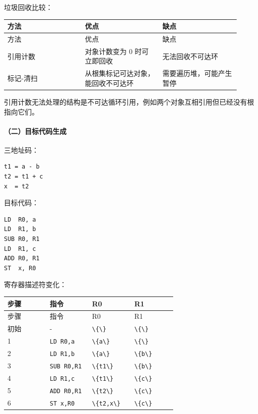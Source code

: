 \documentclass[UTF8]{ctexart}
\begin{document}
垃圾回收比较：

\begin{longtable}{|p{0.31\linewidth}|p{0.31\linewidth}|p{0.31\linewidth}|}
\hline
方法 & 优点 & 缺点 \\
\hline
\endfirsthead
方法 & 优点 & 缺点 \\
\hline
\endhead
引用计数 & 对象计数变为 0 时可立即回收 & 无法回收不可达环 \\
\hline
标记-清扫 & 从根集标记可达对象，能回收不可达环 & 需要遍历堆，可能产生暂停 \\
\hline
\end{longtable}

引用计数无法处理的结构是不可达循环引用，例如两个对象互相引用但已经没有根指向它们。

\paragraph*{（二）目标代码生成}

三地址码：

\begin{Verbatim}[fontsize=\small,breaklines=true]
t1 = a - b
t2 = t1 + c
x  = t2
\end{Verbatim}

目标代码：

\begin{Verbatim}[fontsize=\small,breaklines=true]
LD  R0, a
LD  R1, b
SUB R0, R1
LD  R1, c
ADD R0, R1
ST  x, R0
\end{Verbatim}

寄存器描述符变化：

\begin{longtable}{|p{0.23\linewidth}|p{0.23\linewidth}|p{0.23\linewidth}|p{0.23\linewidth}|}
\hline
步骤 & 指令 & R0 & R1 \\
\hline
\endfirsthead
步骤 & 指令 & R0 & R1 \\
\hline
\endhead
初始 & - & \texttt{\textbackslash{}\{\textbackslash{}\}} & \texttt{\textbackslash{}\{\textbackslash{}\}} \\
\hline
1 & \texttt{LD R0,a} & \texttt{\textbackslash{}\{a\textbackslash{}\}} & \texttt{\textbackslash{}\{\textbackslash{}\}} \\
\hline
2 & \texttt{LD R1,b} & \texttt{\textbackslash{}\{a\textbackslash{}\}} & \texttt{\textbackslash{}\{b\textbackslash{}\}} \\
\hline
3 & \texttt{SUB R0,R1} & \texttt{\textbackslash{}\{t1\textbackslash{}\}} & \texttt{\textbackslash{}\{b\textbackslash{}\}} \\
\hline
4 & \texttt{LD R1,c} & \texttt{\textbackslash{}\{t1\textbackslash{}\}} & \texttt{\textbackslash{}\{c\textbackslash{}\}} \\
\hline
5 & \texttt{ADD R0,R1} & \texttt{\textbackslash{}\{t2\textbackslash{}\}} & \texttt{\textbackslash{}\{c\textbackslash{}\}} \\
\hline
6 & \texttt{ST x,R0} & \texttt{\textbackslash{}\{t2,x\textbackslash{}\}} & \texttt{\textbackslash{}\{c\textbackslash{}\}} \\
\hline
\end{longtable}
\end{document}

